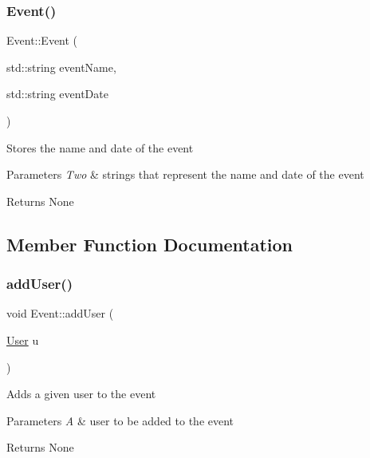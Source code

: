 \subsubsection{\texorpdfstring{Event()}{Event()}\hspace{0.1cm}{\footnotesize\ttfamily [2/2]}}
{\footnotesize\ttfamily Event\+::\+Event (\begin{DoxyParamCaption}\item[{std\+::string}]{event\+Name,  }\item[{std\+::string}]{event\+Date }\end{DoxyParamCaption})}

Stores the name and date of the event 
\begin{DoxyParams}{Parameters}
{\em Two} & strings that represent the name and date of the event \\
\hline
\end{DoxyParams}
\begin{DoxyReturn}{Returns}
None 
\end{DoxyReturn}


\subsection{Member Function Documentation}
\mbox{\label{class_event_a6cf708e6ba961e2392716dd2c53d7938}} 
\subsubsection{\texorpdfstring{add\+User()}{addUser()}}
{\footnotesize\ttfamily void Event\+::add\+User (\begin{DoxyParamCaption}\item[{\mbox{\hyperlink{class_user}{User}}}]{u }\end{DoxyParamCaption})}

Adds a given user to the event 
\begin{DoxyParams}{Parameters}
{\em A} & user to be added to the event \\
\hline
\end{DoxyParams}
\begin{DoxyReturn}{Returns}
None 
\end{DoxyReturn}
\mbox{\label{class_event_a61903b21fd660d7ddaa126dab671a756}} 
